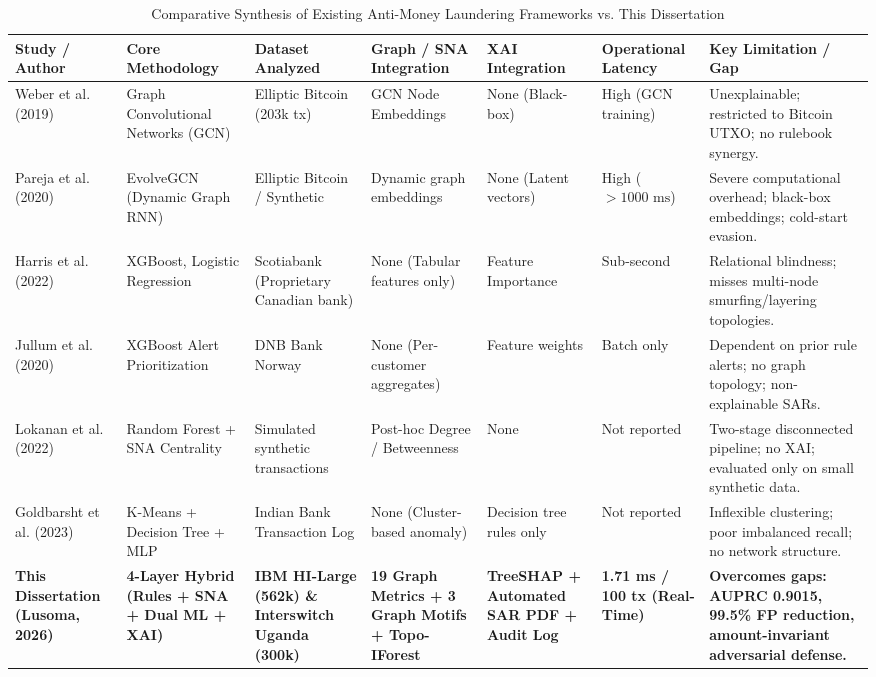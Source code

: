 \begin{table}[hbt!]
\centering
\caption{Comparative Synthesis of Existing Anti-Money Laundering Frameworks vs. This Dissertation}
\label{tab:lit_comparison}
\begin{adjustbox}{width=\textwidth,center=\textwidth}
\begin{tabular}{|p{3.2cm}|p{2.8cm}|p{2.8cm}|p{2.5cm}|p{2.2cm}|p{2.2cm}|p{3.2cm}|}
\hline
\rowcolor{gray!40}
\textbf{Study / Author} & \textbf{Core Methodology} & \textbf{Dataset Analyzed} & \textbf{Graph / SNA Integration} & \textbf{XAI Integration} & \textbf{Operational Latency} & \textbf{Key Limitation / Gap} \\
\hline
Weber et al. (2019)~\cite{weber2019anti} & Graph Convolutional Networks (GCN) & Elliptic Bitcoin (203k tx) & GCN Node Embeddings & None (Black-box) & High (GCN training) & Unexplainable; restricted to Bitcoin UTXO; no rulebook synergy. \\
\hline
Pareja et al. (2020)~\cite{pareja2020evolvegcn} & EvolveGCN (Dynamic Graph RNN) & Elliptic Bitcoin / Synthetic & Dynamic graph embeddings & None (Latent vectors) & High ($>1000\text{ ms}$) & Severe computational overhead; black-box embeddings; cold-start evasion. \\
\hline
Harris et al. (2022)~\cite{harris2022using} & XGBoost, Logistic Regression & Scotiabank (Proprietary Canadian bank) & None (Tabular features only) & Feature Importance & Sub-second & Relational blindness; misses multi-node smurfing/layering topologies. \\
\hline
Jullum et al. (2020)~\cite{jullum2020detecting} & XGBoost Alert Prioritization & DNB Bank Norway & None (Per-customer aggregates) & Feature weights & Batch only & Dependent on prior rule alerts; no graph topology; non-explainable SARs. \\
\hline
Lokanan et al. (2022)~\cite{lokanan2022predicting} & Random Forest + SNA Centrality & Simulated synthetic transactions & Post-hoc Degree / Betweenness & None & Not reported & Two-stage disconnected pipeline; no XAI; evaluated only on small synthetic data. \\
\hline
Goldbarsht et al. (2023)~\cite{goldbarsht2023leveraging} & K-Means + Decision Tree + MLP & Indian Bank Transaction Log & None (Cluster-based anomaly) & Decision tree rules only & Not reported & Inflexible clustering; poor imbalanced recall; no network structure. \\
\hline
\textbf{This Dissertation (Lusoma, 2026)} & \textbf{4-Layer Hybrid (Rules + SNA + Dual ML + XAI)} & \textbf{IBM HI-Large (562k) \& Interswitch Uganda (300k)} & \textbf{19 Graph Metrics + 3 Graph Motifs + Topo-IForest} & \textbf{TreeSHAP + Automated SAR PDF + Audit Log} & \textbf{1.71 ms / 100 tx (Real-Time)} & \textbf{Overcomes gaps: AUPRC 0.9015, 99.5\% FP reduction, amount-invariant adversarial defense.} \\
\hline
\end{tabular}
\end{adjustbox}
\end{table}

